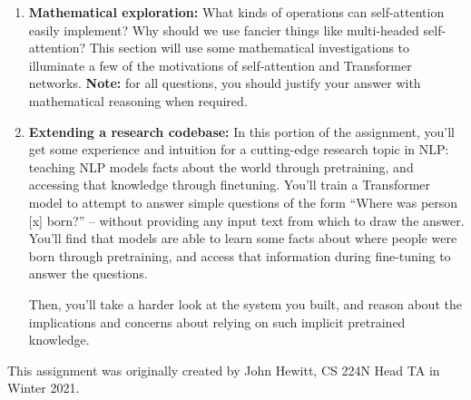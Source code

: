 \documentclass[answers]{exam}
\begin{document}
\begin{enumerate}
\item \textbf{Mathematical exploration:}  What kinds of operations can self-attention easily implement? Why should we use fancier things like multi-headed self-attention?
This section will use some mathematical investigations to illuminate a few of the motivations of self-attention and Transformer networks.
{\color{red} \textbf{Note:} for all questions, you should justify your answer with mathematical reasoning when required.}

\item \textbf{Extending a research codebase:}
In this portion of the assignment, you'll get some experience and intuition for a cutting-edge research topic in NLP: teaching NLP models facts about the world through pretraining, and accessing that knowledge through finetuning.
You'll train a Transformer model to attempt to answer simple questions of the form ``Where was person [x] born?'' -- without providing any input text from which to draw the answer.
You'll find that models are able to learn some facts about where people were born through pretraining, and access that information during fine-tuning to answer the questions.

Then, you'll take a harder look at the system you built, and reason about the implications and concerns about relying on such implicit pretrained knowledge.






























\end{enumerate}

This assignment was originally created by John Hewitt, CS 224N Head TA in Winter 2021. 



\newpage

\begin{questions}
   
   
\end{questions}
\end{document}
